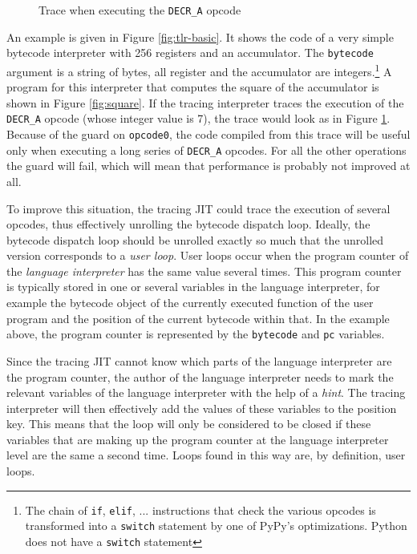 \documentclass{sig-alternate}
\begin{document}
\begin{figure}

\caption{Trace when executing the \texttt{DECR\_A} opcode}
\label{fig:trace-normal}
\end{figure}

An example is given in Figure \ref{fig:tlr-basic}. It shows the code of a very
simple bytecode interpreter with 256 registers and an accumulator.  The
\texttt{bytecode} argument is a string of bytes, all register and the
accumulator are integers.\footnote{The
chain of \texttt{if}, \texttt{elif}, ... instructions that check the various
opcodes is transformed into a \texttt{switch} statement by one of PyPy's
optimizations. Python does not have a \texttt{switch} statement}
A program for this interpreter that computes
the square of the accumulator is shown in Figure \ref{fig:square}. If the
tracing interpreter traces the execution of the \texttt{DECR\_A} opcode (whose
integer value is 7), the trace would look as in Figure \ref{fig:trace-normal}.
Because of the guard on \texttt{opcode0}, the code compiled from this trace will
be useful only when executing a long series of \texttt{DECR\_A} opcodes. For all
the other operations the guard will fail, which will mean that performance is
probably not improved at all.

To improve this situation, the tracing JIT could trace the execution of several
opcodes, thus effectively unrolling the bytecode dispatch loop. Ideally, the
bytecode dispatch loop should be unrolled exactly so much that the unrolled version
corresponds to a \emph{user loop}. User loops
occur when the program counter of the \emph{language interpreter} has the
same value several times. This program counter is typically stored in one or several
variables in the language interpreter, for example the bytecode object of the
currently executed function of the user program and the position of the current
bytecode within that.  In the example above, the program counter is represented by 
the \texttt{bytecode} and \texttt{pc} variables.

Since the tracing JIT cannot know which parts of the language interpreter are
the program counter, the author of the language interpreter needs to mark the
relevant variables of the language interpreter with the help of a \emph{hint}.
The tracing interpreter will then effectively add the values of these variables
to the position key. This means that the loop will only be considered to be
closed if these variables that are making up the program counter at the language
interpreter level are the same a second time.  Loops found in this way are, by
definition, user loops.
\end{document}
